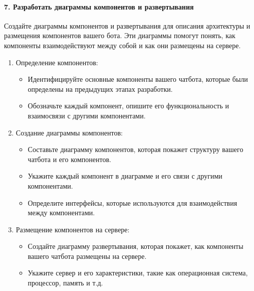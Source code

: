 \documentclass[letterpaper,10pt,russian]{sphinxmanual}
\begin{document}
\paragraph{7. Разработать диаграммы компонентов и развертывания}
\label{\detokenize{educational_materials/uml/content:id16}}
\sphinxAtStartPar
Создайте диаграммы компонентов и развертывания для описания архитектуры и размещения компонентов вашего бота. Эти диаграммы помогут понять, как компоненты взаимодействуют между собой и как они размещены на сервере.
\begin{enumerate}
%
\item {} 
\sphinxAtStartPar
Определение компонентов:
\begin{itemize}
\item {} 
\sphinxAtStartPar
Идентифицируйте основные компоненты вашего чат\sphinxhyphen{}бота, которые были определены на предыдущих этапах разработки.

\item {} 
\sphinxAtStartPar
Обозначьте каждый компонент, опишите его функциональность и взаимосвязи с другими компонентами.

\end{itemize}

\item {} 
\sphinxAtStartPar
Создание диаграммы компонентов:
\begin{itemize}
\item {} 
\sphinxAtStartPar
Составьте диаграмму компонентов, которая покажет структуру вашего чат\sphinxhyphen{}бота и его компонентов.

\item {} 
\sphinxAtStartPar
Укажите каждый компонент в диаграмме и его связи с другими компонентами.

\item {} 
\sphinxAtStartPar
Определите интерфейсы, которые используются для взаимодействия между компонентами.

\end{itemize}

\item {} 
\sphinxAtStartPar
Размещение компонентов на сервере:
\begin{itemize}
\item {} 
\sphinxAtStartPar
Создайте диаграмму развертывания, которая покажет, как компоненты вашего чат\sphinxhyphen{}бота размещены на сервере.

\item {} 
\sphinxAtStartPar
Укажите сервер и его характеристики, такие как операционная система, процессор, память и т.д.


\end{itemize}
\end{enumerate}
\end{document}
